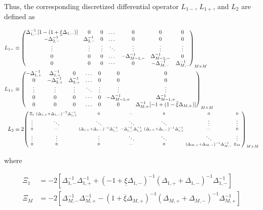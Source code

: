 \documentclass[11pt]{article}
\newenvironment{psmallmatrix}
{\left(\begin{smallmatrix}}
	{\end{smallmatrix}\right)}
\theoremstyle{definition}
\begin{document}
Thus, the corresponding discretized differential operator $L_{1-}$, $L_{1+}$, and $L_2$ are defined as

\begin{align}
L_{1-} &\equiv \begin{pmatrix}
\Delta^{-1}_{1,-} [1 - (1 + \underline{\xi} \Delta_{1,-})] &0&0&\dots&0&0&0\\
-\Delta_{2,-}^{-1}&\Delta_{2,-}^{-1}&0&\dots&0&0&0\\
\vdots&\vdots&\vdots&\ddots&\vdots&\vdots&\vdots\\
0&0&0&\dots&-\Delta_{M-1,-}^{-1}&\Delta_{M-1,-}^{-1}&0\\
0&0&0&\cdots&0&-\Delta_{M,-}^{-1}&\Delta_{M,-}^{-1}
\end{pmatrix}_{M\times M}\label{eq:L-1} \\
L_{1+} &\equiv \begin{pmatrix}
-\Delta_{1,+}^{-1}&\Delta_{1,+}^{-1}&0&\dots&0&0&0\\
0&-\Delta_{2,+}^{-1}&\Delta_{2,+}^{-1}&\dots&0&0&0\\
\vdots&\vdots&\vdots&\ddots&\vdots&\vdots&\vdots\\
0&0&0&\cdots&0&-\Delta_{M-1,+}^{-1}&\Delta_{M-1,+}^{-1}\\
0&0&0&\dots&0&0&\Delta_{M,+}^{-1}  [-1 + (1 - \overline{\xi} \Delta_{M,+})]  \\
\end{pmatrix}_{M\times M}\label{eq:L-1-plus} \\
L_2 &\equiv 2 \begin{psmallmatrix}
\Xi_1 &
(\Delta_{1,+}+\Delta_{1,-})^{-1} \Delta_{1,+}^{-1}
&0&\cdots&0&0&0 \\
\vdots&\ddots&\ddots&\ddots&\ddots&\vdots&\vdots\\
0&\cdots&
(\Delta_{i,+}+\Delta_{i,-})^{-1} \Delta_{i,-}^{-1} &
-\Delta_{i,-}^{-1} \Delta_{i,+}^{-1}  &
(\Delta_{i,+}+\Delta_{i,-})^{-1} \Delta_{i,+}^{-1}&\cdots&0 \\
\vdots&\vdots&\vdots&\ddots&\ddots&\ddots&\vdots\\
0&0&0&\cdots&0&(\Delta_{M,+}+\Delta_{M,-})^{-1} \Delta_{M,-}^{-1}&\Xi_M
\end{psmallmatrix}_{M\times M}\label{eq:L-2}
\end{align}

where

\begin{align}
\Xi_{1} &= -2\left[  \Delta_{1,-}^{-1} \Delta_{1,+}^{-1} + (-1 + \underline{\xi} \Delta_{1,-})^{-1} (\Delta_{1,+} + \Delta_{1,-})^{-1}  \Delta_{1,-}^{-1} \right] \\
\Xi_{M} &= -2\left[  \Delta_{M,-}^{-1} \Delta_{M,+}^{-1} - (1 + \overline{\xi} \Delta_{M,+})^{-1} (\Delta_{M,+} + \Delta_{M,-})^{-1}  \Delta_{M,+}^{-1} \right]
\end{align}
\end{document}
